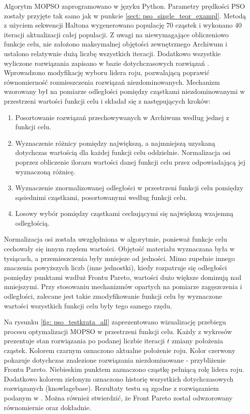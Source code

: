 Algorytm MOPSO zaprogramowano w języku Python. Parametry prędkości PSO zostały przyjęte tak samo jak w punkcie \ref{sect: pso_single_teor_exampl}. Metodą z użyciem sekwencji Haltona wygenerowano populację 70 cząstek i wykonano 40 iteracji aktualizacji całej populacji. Z uwagi na niewymagające obliczeniowo funkcje celu, nie założono maksymalnej objętości zewnętrznego Archiwum i ustalono relatywnie dużą liczbę wszystkich iteracji. Dodatkowo wszystkie wyliczone rozwiązania zapisano w bazie dotychczasowych rozwiązań . Wprowadzono modyfikację wyboru lidera roju, pozwalającą poprawić równomierność rozmieszczenia rozwiązań niezdominowanych. Mechanizm wzorowany był na pomiarze odległości pomiędzy cząstkami niezdominowanymi w przestrzeni wartości funkcji celu \parencite{Deb2002} i składał się z następujących kroków:
\begin{enumerate}
	\item Posortowanie rozwiązań przechowywanych w Archiwum według jednej z funkcji celu.
	\item Wyznaczenie różnicy pomiędzy największą, a najmniejszą uzyskaną dotychczas wartością dla każdej funkcji celu oddzielnie. Normalizacja osi poprzez obliczenie ilorazu wartości danej funkcji celu przez odpowiadającą jej wyznaczoną różnicę.
	\item Wyznaczenie znormalizowanej odległości w przestrzeni funkcji celu pomiędzy sąsiednimi cząstkami, posortowanymi według funkcji celu.
	\item Losowy wybór pomiędzy cząstkami cechującymi się największą wzajemną odległością.
\end{enumerate}
Normalizacja osi została uwzględniona w algorytmie, ponieważ funkcje celu cechowały się innym rzędem wartości. Objętość materiału wyznaczana była w tysiącach, a przemieszczenia były mniejsze od jedności. Mimo zupełnie innego znaczenia powyższych liczb (inne jednostki), kiedy rozpatruje się odległości pomiędzy punktami wzdłuż Frontu Pareto, wartości dużo większe dominują nad mniejszymi. Przy stosowaniu mechanizmów opartych na pomiarze zagęszczenia i odległości, zalecane jest takie zmodyfikowanie funkcji celu by wyznaczone wartości wszystkich funkcji celu były tego samego rzędu.

Na rysunku \ref{fig: pso_testkrata_all} zaprezentowano wizualizację przebiegu procesu optymalizacji MOPSO w przestrzeni funkcji celu. Każdy z wykresów prezentuje stan rozwiązania po podanej liczbie iteracji $t$ zmiany położenia cząstek. Kolorem czarnym oznaczono aktualne położenie roju. Kolor czerwony pokazuje dotychczas znalezione rozwiązania niezdominowane - przybliżenie Frontu Pareto. Niebieskim punktem zaznaczono cząstkę pełniącą rolę lidera roju. Dodatkowo kolorem zielonym oznaczono historię wszystkich dotychczasowych rozwiązanych (knowlagebase). Rezultaty testu są zgodne z rozwiązaniem podanym w \parencite{Zavala2014}. Można również stwierdzić, że Front Pareto został odwzorowany równomiernie oraz dokładnie.


